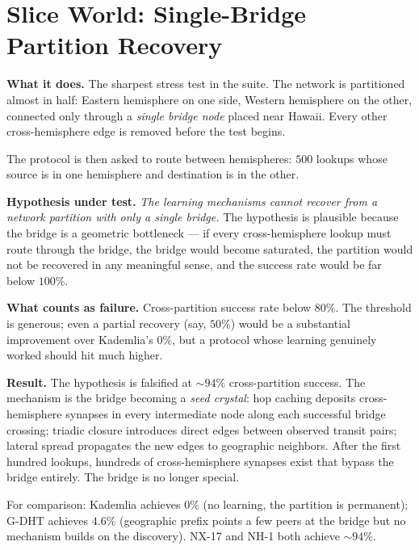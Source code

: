 \documentclass[twoside,nobib]{tufte-book}
\newcommand{\GDHT}{G-DHT\xspace}
\begin{document}
\section{Slice World: Single-Bridge Partition Recovery}

\textbf{What it does.} The sharpest stress test in the
suite. The
network is partitioned almost in half: Eastern hemisphere on one
side, Western hemisphere on the other, connected only through a
\emph{single bridge node} placed near Hawaii. Every other
cross-hemisphere edge is removed before the test begins.

The protocol is then asked to route between hemispheres: $500$
lookups whose source is in one hemisphere and destination is in
the other.

\textbf{Hypothesis under test.} \emph{The learning mechanisms
cannot recover from a network partition with only a single
bridge.} The hypothesis is plausible because the bridge is a
geometric bottleneck --- if every cross-hemisphere lookup must
route through the bridge, the bridge would become saturated,
the partition would not be recovered in any meaningful sense,
and the success rate would be far below $100\%$.

\textbf{What counts as failure.} Cross-partition success rate
below $80\%$. The threshold is generous; even a partial recovery
(say, $50\%$) would be a substantial improvement over Kademlia's
$0\%$, but a protocol whose learning genuinely worked should hit
much higher.

\textbf{Result.} The hypothesis is falsified at $\sim 94\%$
cross-partition success. The mechanism is the bridge becoming
a \emph{seed crystal}: hop caching deposits cross-hemisphere
synapses in every intermediate node along each successful
bridge crossing; triadic closure introduces direct edges
between observed transit pairs; lateral spread propagates the
new edges to geographic neighbors. After the first hundred
lookups, hundreds of cross-hemisphere synapses exist that
bypass the bridge entirely. The bridge is no longer special.

For comparison: Kademlia achieves $0\%$ (no learning, the
partition is permanent); \GDHT achieves $4.6\%$ (geographic
prefix points a few peers at the bridge but no mechanism builds
on the discovery). NX-17 and NH-1 both achieve $\sim 94\%$.
\end{document}
